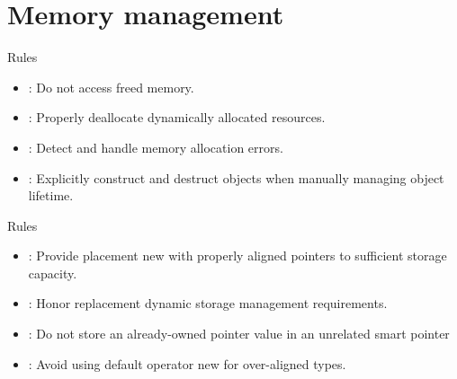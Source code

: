 \section{Memory management}

\begin{frame}[t]{Rules}
\begin{itemize}
  \item {}: 
        Do not access freed memory.
  \vfill
  \item {}: 
        Properly deallocate dynamically allocated resources.
  \vfill
  \item {}: 
        Detect and handle memory allocation errors.
  \vfill
  \item {}: 
        Explicitly construct and destruct objects when manually managing object lifetime.
  \vfill
\end{itemize}
\end{frame}

\begin{frame}[t]{Rules}
\begin{itemize}
  \item {}: 
        Provide placement new with properly aligned pointers to sufficient storage capacity.
  \vfill
  \item {}: 
        Honor replacement dynamic storage management requirements.
  \vfill
  \item {}: 
        Do not store an already-owned pointer value in an unrelated smart pointer
  \vfill
  \item {}: 
        Avoid using default operator new for over-aligned types.
\end{itemize}
\end{frame}


